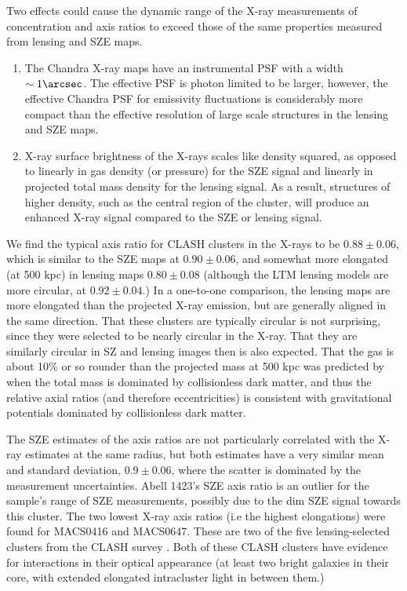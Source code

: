 \documentclass[iop,twocolumn]{emulateapj}
\begin{document}
{Two effects could cause the dynamic range of the X-ray measurements of concentration and axis ratios to exceed
those of the same properties measured from lensing and SZE maps.
\begin{enumerate}
\item The Chandra X-ray maps have an instrumental PSF with a width $\sim1\arcsec$. The effective PSF is photon limited
to be larger, however, the effective Chandra PSF for emissivity fluctuations is considerably more compact than the effective
resolution of large scale structures in the lensing and SZE maps. 
\item X-ray surface brightness of the
X-rays scales like density squared, 
as opposed to linearly in gas density (or pressure) 
for the SZE signal and linearly in projected total mass density for the lensing signal. As a result, structures of higher density, such as the
central region of the cluster, will produce an enhanced X-ray signal compared to the SZE or lensing signal.
\end{enumerate}

We find the typical axis ratio for CLASH clusters in the X-rays to be $0.88\pm0.06$, which is 
similar to the SZE maps at $0.90\pm0.06$, and somewhat
more elongated (at 500 kpc) in lensing maps $0.80\pm0.08$ (although the LTM lensing models
are more circular, at $0.92 \pm 0.04$.) In a one-to-one comparison, the lensing
maps are more elongated than the projected X-ray emission, but are generally aligned in the same direction.
That these clusters are typically circular is
not surprising, since they were selected to be nearly circular in the X-ray. That they are similarly circular in SZ
and lensing images then is also expected. That the gas is about 10\% or so rounder than the
projected mass at 500 kpc was predicted by \citet[e.g.][]{2007MNRAS.377..883F}  
when the total mass is dominated by collisionless dark matter, and thus the relative axial ratios (and therefore eccentricities)
is consistent with gravitational potentials dominated by collisionless dark matter.

The SZE estimates of the axis ratios are not particularly correlated with the X-ray estimates
at the same radius, but both estimates have a very similar mean and standard deviation, $0.9 \pm 0.06$, where the
scatter is dominated by the measurement uncertainties.
Abell 1423's SZE axis ratio is an outlier for the sample's range of SZE measurements, 
possibly due to the dim SZE signal towards this cluster. The two lowest X-ray axis ratios (i.e the highest elongations) 
were found for MACS0416 and MACS0647.   These are two of the five lensing-selected clusters from the CLASH survey \citep{2012ApJS..199...25P}.
Both of these CLASH clusters have evidence for interactions in their optical appearance (at least two bright
galaxies in their core, with extended elongated intracluster light in between them.)

}
\end{document}
